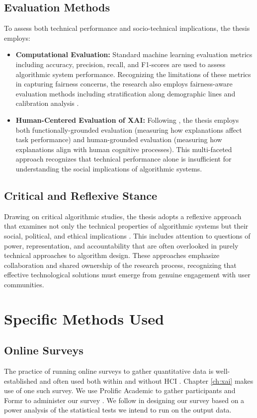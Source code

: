 \subsection{Evaluation Methods}\label{ssec:context_evaluation_methods}
To assess both technical performance and socio-technical implications, the thesis employs:
\begin{itemize}
    \item \textbf{Computational Evaluation:} Standard machine learning evaluation metrics including accuracy, precision, recall, and F1-scores are used to assess algorithmic system performance. Recognizing the limitations of these metrics in capturing fairness concerns, the research also employs fairness-aware evaluation methods including stratification along demographic lines and calibration analysis \cite{mehrabi2021survey}.
    \item \textbf{Human-Centered Evaluation of XAI:} Following \textcite{doshi-velez_towards_2017}, the thesis employs both functionally-grounded evaluation (measuring how explanations affect task performance) and human-grounded evaluation (measuring how explanations align with human cognitive processes). This multi-faceted approach recognizes that technical performance alone is insufficient for understanding the social implications of algorithmic systems.
\end{itemize}

\subsection{Critical and Reflexive Stance}\label{ssec:context_reflexivity}
Drawing on critical algorithmic studies, the thesis adopts a reflexive approach that examines not only the technical properties of algorithmic systems but their social, political, and ethical implications \cite{seaver2017algorithms}. This includes attention to questions of power, representation, and accountability that are often overlooked in purely technical approaches to algorithm design. These approaches emphasize collaboration and shared ownership of the research process, recognizing that effective technological solutions must emerge from genuine engagement with user communities.

\section{Specific Methods Used}
\subsection{Online Surveys}
The practice of running online surveys to gather quantitative data is well-established and often used both within and without HCI \cite{zhao2023fairness,pillai_adoption_2020,krishna_disagreement_2022,mai_user_nodate,bansal_does_2021,binns_its_2018,dzindolet_role_2003,papenmeier_its_2022}. Chapter \ref{ch:xai} makes use of one such survey. We use Prolific Academic to gather participants and Formr to administer our survey \cite{binns_its_2018,Arslan_formr_2019}. We follow \textcite{caldwell_power_nodate} in designing our survey based on a power analysis of the statistical tests we intend to run on the output data.

